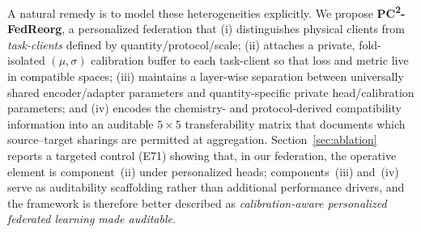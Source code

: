 \documentclass[11pt,a4paper]{article}
\newcommand{\PC}{PC\textsuperscript{2}-FedReorg}
\begin{document}
A natural remedy is to model these heterogeneities explicitly. We propose \textbf{\PC{}}, a personalized federation that (i) distinguishes physical clients from \emph{task-clients} defined by quantity/protocol/scale; (ii) attaches a private, fold-isolated $(\mu, \sigma)$ calibration buffer to each task-client so that loss and metric live in compatible spaces; (iii) maintains a layer-wise separation between universally shared encoder/adapter parameters and quantity-specific private head/calibration parameters; and (iv) encodes the chemistry- and protocol-derived compatibility information into an auditable $5\times 5$ transferability matrix that documents which source--target sharings are permitted at aggregation. Section~\ref{sec:ablation} reports a targeted control (E71) showing that, in our federation, the operative element is component~(ii) under personalized heads; components~(iii) and~(iv) serve as auditability scaffolding rather than additional performance drivers, and the framework is therefore better described as \emph{calibration-aware personalized federated learning made auditable}.
\end{document}
